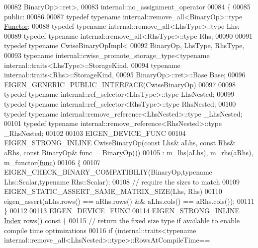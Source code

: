 \begin{DoxyCode}
00082                                                         BinaryOp>::ret>,
00083   internal::no\_assignment\_operator
00084 \{
00085   \textcolor{keyword}{public}:
00086     
00087     \textcolor{keyword}{typedef} \textcolor{keyword}{typename} internal::remove\_all<BinaryOp>::type \hyperlink{struct_functor}{Functor};
00088     \textcolor{keyword}{typedef} \textcolor{keyword}{typename} internal::remove\_all<LhsType>::type Lhs;
00089     \textcolor{keyword}{typedef} \textcolor{keyword}{typename} internal::remove\_all<RhsType>::type Rhs;
00090 
00091     \textcolor{keyword}{typedef} \textcolor{keyword}{typename} CwiseBinaryOpImpl<
00092         BinaryOp, LhsType, RhsType,
00093         \textcolor{keyword}{typename} internal::cwise\_promote\_storage\_type<typename internal::traits<LhsType>::StorageKind,
00094                                                       \textcolor{keyword}{typename} internal::traits<Rhs>::StorageKind,
00095                                                       BinaryOp>::ret>::Base Base;
00096     EIGEN\_GENERIC\_PUBLIC\_INTERFACE(CwiseBinaryOp)
00097 
00098     \textcolor{keyword}{typedef} \textcolor{keyword}{typename} internal::ref\_selector<LhsType>::type LhsNested;
00099     \textcolor{keyword}{typedef} \textcolor{keyword}{typename} internal::ref\_selector<RhsType>::type RhsNested;
00100     \textcolor{keyword}{typedef} \textcolor{keyword}{typename} internal::remove\_reference<LhsNested>::type \_LhsNested;
00101     \textcolor{keyword}{typedef} \textcolor{keyword}{typename} internal::remove\_reference<RhsNested>::type \_RhsNested;
00102 
00103     EIGEN\_DEVICE\_FUNC
00104     EIGEN\_STRONG\_INLINE CwiseBinaryOp(\textcolor{keyword}{const} Lhs& aLhs, \textcolor{keyword}{const} Rhs& aRhs, \textcolor{keyword}{const} BinaryOp& 
      \hyperlink{structfunc}{func} = BinaryOp())
00105       : m\_lhs(aLhs), m\_rhs(aRhs), m\_functor(\hyperlink{structfunc}{func})
00106     \{
00107       EIGEN\_CHECK\_BINARY\_COMPATIBILIY(BinaryOp,\textcolor{keyword}{typename} Lhs::Scalar,\textcolor{keyword}{typename} Rhs::Scalar);
00108       \textcolor{comment}{// require the sizes to match}
00109       EIGEN\_STATIC\_ASSERT\_SAME\_MATRIX\_SIZE(Lhs, Rhs)
00110       eigen\_assert(aLhs.rows() == aRhs.rows() && aLhs.cols() == aRhs.cols());
00111     \}
00112 
00113     EIGEN\_DEVICE\_FUNC
00114     EIGEN\_STRONG\_INLINE \hyperlink{namespace_eigen_a62e77e0933482dafde8fe197d9a2cfde}{Index} rows()\textcolor{keyword}{ const }\{
00115       \textcolor{comment}{// return the fixed size type if available to enable compile time optimizations}
00116       \textcolor{keywordflow}{if} (internal::traits<\textcolor{keyword}{typename} internal::remove\_all<LhsNested>::type>::RowsAtCompileTime==

\end{DoxyCode}
